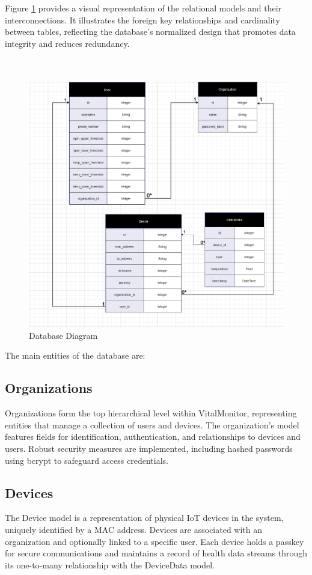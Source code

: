 \noindent Figure \ref{fig:database-diagram} provides a visual representation of the relational models and their interconnections. It illustrates the foreign key relationships and cardinality between tables, reflecting the database's normalized design that promotes data integrity and reduces redundancy.\\ \\ \\ 

\begin{figure}[!h]
    \centering
    \includegraphics[width=\linewidth]{images/database-obj-relation.png}
    \caption{Database Diagram}
    \label{fig:database-diagram}
\end{figure}

\noindent The main entities of the database are:
\subsection{Organizations}
Organizations form the top hierarchical level within VitalMonitor, representing entities that manage a collection of users and devices. The organization's model features fields for identification, authentication, and relationships to devices and users. Robust security measures are implemented, including hashed passwords using bcrypt to safeguard access credentials.

\subsection{Devices}
The Device model is a representation of physical IoT devices in the system, uniquely identified by a MAC address. Devices are associated with an organization and optionally linked to a specific user. Each device holds a passkey for secure communications and maintains a record of health data streams through its one-to-many relationship with the DeviceData model.


